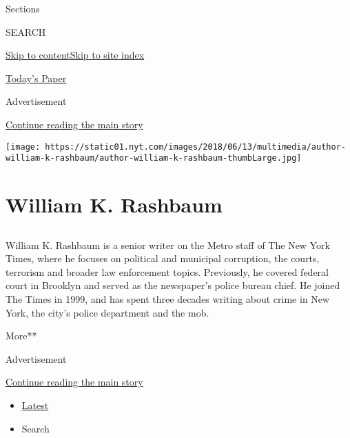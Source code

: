 Sections

SEARCH

\protect\hyperlink{site-content}{Skip to
content}\protect\hyperlink{site-index}{Skip to site index}

\href{https://myaccount.nytimes.com/auth/login?response_type=cookie\&client_id=vi}{}

\href{https://www.nytimes.com/section/todayspaper}{Today's Paper}

Advertisement

\protect\hyperlink{after-top}{Continue reading the main story}

\texttt{[image: https://static01.nyt.com/images/2018/06/13/multimedia/author-william-k-rashbaum/author-william-k-rashbaum-thumbLarge.jpg]}

\hypertarget{william-k-rashbaum}{%
\section{William K. Rashbaum}\label{william-k-rashbaum}}

\subsection{}

William K. Rashbaum is a senior writer on the Metro staff of The New
York Times, where he focuses on political and municipal corruption, the
courts, terrorism and broader law enforcement topics. Previously, he
covered federal court in Brooklyn and served as the newspaper's police
bureau chief. He joined The Times in 1999, and has spent three decades
writing about crime in New York, the city's police department and the
mob.

More**

Advertisement

\protect\hyperlink{after-mid1}{Continue reading the main story}

\begin{itemize}
\tightlist
\item
  \protect\hyperlink{stream-panel}{Latest}
\item
  Search
\end{itemize}


